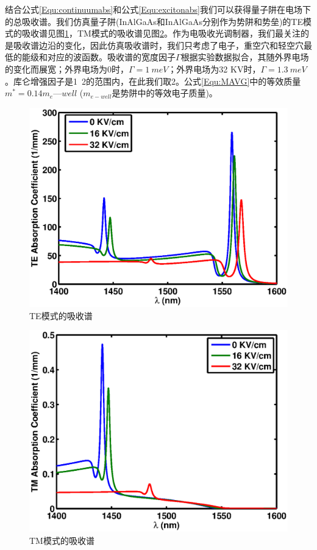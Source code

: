 结合公式\ref{Equ:continuumabs}和公式\ref{Equ:excitonabs}我们可以获得量子阱在电场下的总吸收谱。我们仿真量子阱(InAlGaAs和InAlGaAs分别作为势阱和势垒)的TE模式的吸收谱见图\ref{fig_ch2_te_abs}，TM模式的吸收谱见图\ref{fig_ch2_tm_abs}。作为电吸收光调制器，我们最关注的是吸收谱边沿的变化，因此仿真吸收谱时，我们只考虑了电子，重空穴和轻空穴最低的能级和对应的波函数。吸收谱的宽度因子$\Gamma$根据实验数据拟合，其随外界电场的变化而展宽；外界电场为0时，$ \Gamma = 1 ~meV$；外界电场为32 KV时，$ \Gamma = 1.3 ~meV$。库仑增强因子是1~2的范围内\cite{mares1993modeling, chuang1995physics}，在此我们取2。公式\ref{Equ:MAVG}中的等效质量$m^* = 0.14m_e—well$ ($m_{e-well}$是势阱中的等效电子质量)。

\begin{figure}[htb]
	\centering
	\includegraphics[width=12cm]{./Pictures/fig_ch2_te_abs.eps}
	\caption{TE模式的吸收谱}
	\label{fig_ch2_te_abs}
\end{figure}
\begin{figure}[htb]
	\centering
	\includegraphics[width=12cm]{./Pictures/fig_ch2_tm_abs.eps}
	\caption{TM模式的吸收谱}
	\label{fig_ch2_tm_abs}
\end{figure}

